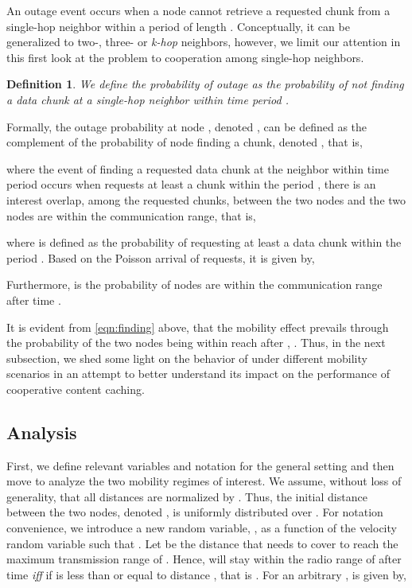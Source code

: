 \documentclass[conference,a4paper]{IEEEtran}
\newtheorem*{theorem:outage}{Definition}
\begin{document}
An outage event occurs when a node cannot retrieve a requested chunk from a single-hop neighbor within a period of length . Conceptually, it can be generalized to two-, three- or {\it k-hop} neighbors, however, we limit our attention in this first look at the problem to cooperation among single-hop neighbors.

\begin{theorem:outage}
We define the probability of outage as the probability of not finding a data chunk at a single-hop neighbor within time period .
\end{theorem:outage}

Formally, the outage probability at node , denoted , can be defined as the complement of the probability of node  finding a chunk, denoted , that is,


\noindent where the event of  finding a requested data chunk at the neighbor  within time period  occurs when  requests at least a chunk within the period , there is an interest overlap, among the requested chunks, between the two nodes  and the two nodes are within the communication range, that is,


\noindent where  is defined as the probability of  requesting at least a data chunk within the period . Based on the Poisson arrival of requests, it is given by,


Furthermore,  is the probability of nodes  are within the communication range after time .

It is evident from \eqref{eqn:finding} above, that the mobility effect prevails through the probability of the two nodes being within reach after , . Thus, in the next subsection, we shed some light on the behavior of  under different mobility scenarios in an attempt to better understand its impact on the performance of cooperative content caching.

\subsection{Analysis}
First, we define relevant variables and notation for the general setting and then move to analyze the two mobility regimes of interest. We assume, without loss of generality, that all distances are normalized by . Thus, the initial distance between the two nodes, denoted , is uniformly distributed over . For notation convenience, we introduce a new random variable, , as a function of the velocity random variable  such that . Let  be the distance that  needs to cover to reach the maximum transmission range of . Hence,  will stay within the radio range of  after time  {\it iff} if  is less than or equal to distance , that is . For an arbitrary ,  is given by,
\end{document}

